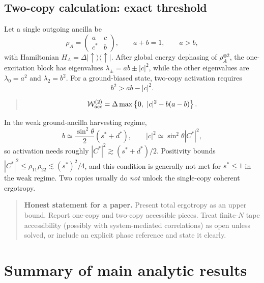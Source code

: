 \documentclass[11pt,a4paper]{article}
\newcommand{\proj}[1]{|#1\rangle\langle #1|}
\newcommand{\W}{\mathcal{W}}
\newenvironment{resultbox}{\begin{quote}\small\color{blue!40!black}}{\end{quote}}
\newenvironment{notebox}{\begin{quote}\small}{\end{quote}}
\begin{document}
\subsection{Two-copy calculation: exact threshold}

Let a single outgoing ancilla be
\begin{equation}
\rho_A=\begin{pmatrix}a&c\\c^*&b\end{pmatrix},
\qquad
 a+b=1,
\qquad
 a>b,
\end{equation}
with Hamiltonian $H_A=\Delta\proj{\uparrow}$. After global energy dephasing of $\rho_A^{\otimes2}$, the one-excitation block has eigenvalues $\lambda_\pm=ab\pm|c|^2$, while the other eigenvalues are $\lambda_0=a^2$ and $\lambda_2=b^2$. For a ground-biased state, two-copy activation requires
\begin{equation}
b^2>ab-|c|^2.
\end{equation}
\begin{resultbox}
\begin{equation}
\W_{\rm acc}^{(2)}=\Delta\max\left\{0,\ |c|^2-b(a-b)\right\}.
\end{equation}
\end{resultbox}
In the weak ground-ancilla harvesting regime,
\begin{equation}
b\simeq \frac{\sin^2\theta}{2}(s^*+d^*),
\qquad
|c|^2\simeq \sin^2\theta |C^*|^2,
\end{equation}
so activation needs roughly $|C^*|^2\gtrsim (s^*+d^*)/2$. Positivity bounds $|C^*|^2\le\rho_{11}\rho_{22}\lesssim (s^*)^2/4$, and this condition is generally not met for $s^*\le1$ in the weak regime. Two copies usually do \emph{not} unlock the single-copy coherent ergotropy.

\begin{notebox}
\textbf{Honest statement for a paper.} Present total ergotropy as an upper bound. Report one-copy and two-copy accessible pieces. Treat finite-$N$ tape accessibility (possibly with system-mediated correlations) as open unless solved, or include an explicit phase reference and state it clearly.
\end{notebox}

\section{Summary of main analytic results}\label{sec:summary}
\end{document}

